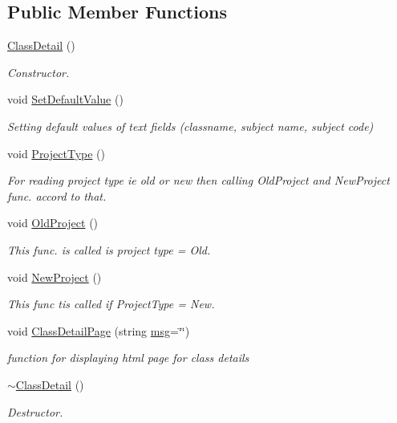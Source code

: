 \subsection*{Public Member Functions}
\begin{DoxyCompactItemize}
\item 
\hyperlink{classClassDetail_a70975c4ff964e21958e31f2020cdc643}{Class\-Detail} ()
\begin{DoxyCompactList}\small\item\em Constructor. \end{DoxyCompactList}\item 
void \hyperlink{classClassDetail_a2e2384f482bb2dca5f2d8a1c27491ae9}{Set\-Default\-Value} ()
\begin{DoxyCompactList}\small\item\em Setting default values of text fields (classname, subject name, subject code) \end{DoxyCompactList}\item 
void \hyperlink{classClassDetail_a360bb591c7b1559d1b6bac0609dbad1e}{Project\-Type} ()
\begin{DoxyCompactList}\small\item\em For reading project type ie old or new then calling Old\-Project and New\-Project func. accord to that. \end{DoxyCompactList}\item 
void \hyperlink{classClassDetail_af8cb05bf1c3d5581edddcdab96def081}{Old\-Project} ()
\begin{DoxyCompactList}\small\item\em This func. is called is project type = Old. \end{DoxyCompactList}\item 
void \hyperlink{classClassDetail_a521c8e315fa844a04932382ae85335bf}{New\-Project} ()
\begin{DoxyCompactList}\small\item\em This func tis called if Project\-Type = New. \end{DoxyCompactList}\item 
void \hyperlink{classClassDetail_a645fe4306391def818cdadbdc3febbf7}{Class\-Detail\-Page} (string \hyperlink{classInputDetail_a1abb16cd695678c3fa05e3c812823fee}{msg}=\char`\"{}\char`\"{})
\begin{DoxyCompactList}\small\item\em function for displaying html page for class details \end{DoxyCompactList}\item 
\hyperlink{classClassDetail_a2aeaf33b0a277a897aad308cffde211a}{$\sim$\-Class\-Detail} ()
\begin{DoxyCompactList}\small\item\em Destructor. \end{DoxyCompactList}\end{DoxyCompactItemize}
